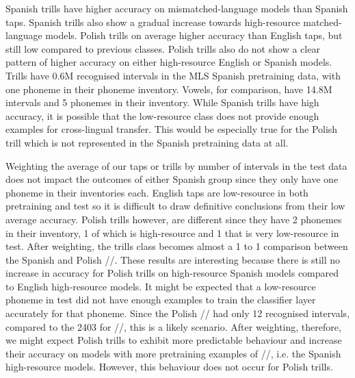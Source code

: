 Spanish trills have higher accuracy on mismatched-language models than Spanish taps. Spanish trills also show a gradual increase towards high-resource matched-language models. Polish trills on average higher accuracy than English taps, but still low compared to previous classes. Polish trills also do not show a clear pattern of higher accuracy on either high-resource English or Spanish models. Trills have 0.6M recognised intervals in the MLS Spanish pretraining data, with one phoneme in their phoneme inventory. Vowels, for comparison, have 14.8M intervals and 5 phonemes in their inventory. While Spanish trills have high accuracy, it is possible that the low-resource class does not provide enough examples for cross-lingual transfer. This would be especially true for the Polish trill  which is not represented in the Spanish pretraining data at all. 

Weighting the average of our taps or trills by number of intervals in the test data does not impact the outcomes of either Spanish group since they only have one phoneme in their inventories each. English taps are low-resource in both pretraining and test so it is difficult to draw definitive conclusions from their low average accuracy. Polish trills however, are different since they have 2 phonemes in their inventory, 1 of which is high-resource and 1 that is very low-resource in test. After weighting, the trills class becomes almost a 1 to 1 comparison between the Spanish and Polish //. These results are interesting because there is still no increase in accuracy for Polish trills on high-resource Spanish models compared to English high-resource models. It might be expected that a low-resource phoneme in test did not have enough examples to train the classifier layer accurately for that phoneme. Since the Polish // had only 12 recognised intervals, compared to the 2403 for //, this is a likely scenario. After weighting, therefore, we might expect Polish trills to exhibit more predictable behaviour and increase their accuracy on models with more pretraining examples of //, i.e. the Spanish high-resource models. However, this behaviour does not occur for Polish trills. 

